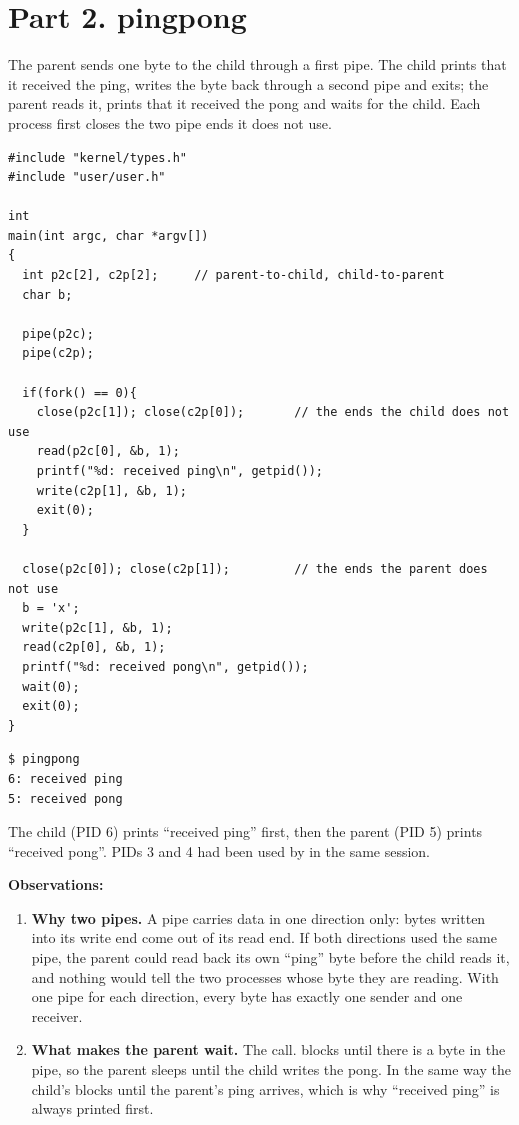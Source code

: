 \documentclass[11pt,a4paper]{article}
\begin{document}
\section{Part 2. pingpong}

The parent sends one byte to the child through a first pipe. The child prints that it received
the ping, writes the byte back through a second pipe and exits; the parent reads it, prints that
it received the pong and waits for the child. Each process first closes the two pipe ends it
does not use.

\begin{lstlisting}[style=ccode,caption={user/pingpong.c}]
#include "kernel/types.h"
#include "user/user.h"

int
main(int argc, char *argv[])
{
  int p2c[2], c2p[2];     // parent-to-child, child-to-parent
  char b;

  pipe(p2c);
  pipe(c2p);

  if(fork() == 0){
    close(p2c[1]); close(c2p[0]);       // the ends the child does not use
    read(p2c[0], &b, 1);
    printf("%d: received ping\n", getpid());
    write(c2p[1], &b, 1);
    exit(0);
  }

  close(p2c[0]); close(c2p[1]);         // the ends the parent does not use
  b = 'x';
  write(p2c[1], &b, 1);
  read(c2p[0], &b, 1);
  printf("%d: received pong\n", getpid());
  wait(0);
  exit(0);
}
\end{lstlisting}

\begin{lstlisting}[caption={pingpong in xv6}]
$ pingpong
6: received ping
5: received pong
\end{lstlisting}

The child (PID 6) prints ``received ping'' first, then the parent (PID 5) prints ``received
pong''. PIDs 3 and 4 had been used by  in the same session.

\textbf{Observations:}
\begin{enumerate}
  \item \textbf{Why two pipes.} A pipe carries data in one direction only: bytes written into
  its write end come out of its read end. If both directions used the same pipe, the parent could
  read back its own ``ping'' byte before the child reads it, and nothing would tell the two
  processes whose byte they are reading. With one pipe for each direction, every byte has exactly
  one sender and one receiver.
  \item \textbf{What makes the parent wait.} The  call. 
  blocks until there is a byte in the pipe, so the parent sleeps until the child writes the pong.
  In the same way the child's  blocks until the parent's ping
  arrives, which is why ``received ping'' is always printed first.
\end{enumerate}
\end{document}
